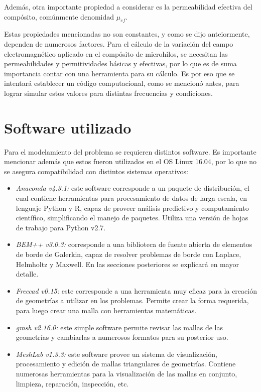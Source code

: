 \documentclass[12pt,letterpaper]{article}
\numberwithin{equation}{section}
\begin{document}
Además, otra importante propiedad a considerar es la permeabilidad efectiva del compósito, comúnmente denomidad $\mu_{ef}$. 

Estas propiedades mencionadas no son constantes, y como se dijo anteiormente, dependen de numerosos factores. Para el cálculo de la variación del campo electromagnético aplicado en el compósito de microhilos, se necesitan las permeabilidades y permitividades básicas y efectivas, por lo que es de suma importancia contar con una herramienta para su cálculo. Es por eso que se intentará establecer un código computacional, como se mencionó antes, para lograr simular estos valores para distintas frecuencias y condiciones.
 
\section{Software utilizado}

Para el modelamiento del problema se requieren distintos software. Es importante mencionar además que estos fueron utilizados en el OS Linux 16.04, por lo que no se asegura compatibilidad con distintos sistemas operativos:

\begin{itemize}
	\item \textit{Anaconda v4.3.1:} este software corresponde a un paquete de distribución, el cual contiene herramientas para procesamiento de datos de larga escala, en lenguaje Python y R, capaz de proveer análisis predictivo y computamiento científico, simplificando el manejo de paquetes. Utiliza una versión de hojas de trabajo para Python v2.7.
	
	\item \textit{BEM++ v3.0.3:} corresponde a una biblioteca de fuente abierta de elementos de borde de Galerkin, capaz de resolver problemas de borde con Laplace, Helmholtz y Maxwell. En las secciones posteriores se explicará en mayor detalle.
	
	\item \textit{Freecad v0.15:} este corresponde a una herramienta muy eficaz para la creación de geometrías a utilizar en los problemas. Permite crear la forma requerida, para luego crear una malla con herramientas matemáticas.
	
	\item \textit{gmsh v2.16.0:} este simple software permite revisar las mallas de las geometrías y cambiarlas a numerosos formatos para su posterior uso.
	
	\item \textit{MeshLab v1.3.3:} este software provee un sistema de visualización, procesamiento y edición de mallas triangulares de geometrías. Contiene numerosas herramientas para la visualización de las mallas en conjunto, limpieza, reparación, inspección, etc. 
	
	
\end{itemize}
\end{document}
